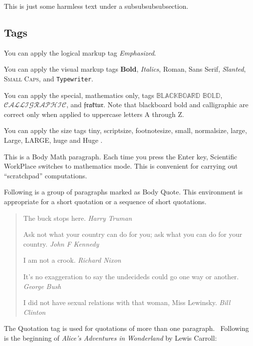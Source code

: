 \documentclass{article}
\begin{document}
This is just some harmless text under a subsubsubsubsection.

\subsection{Tags}

You can apply the logical markup tag \emph{Emphasized}.

You can apply the visual markup tags \textbf{Bold}, \textit{Italics}, 
\textrm{Roman}, \textsf{Sans Serif}, \textsl{Slanted}, \textsc{Small Caps},
and \texttt{Typewriter}.

You can apply the special, mathematics only, tags $\mathbb{BLACKBOARD}$ $%
\mathbb{BOLD}$, $\mathcal{CALLIGRAPHIC}$, and $\mathfrak{fraktur}$. Note
that blackboard bold and calligraphic are correct only when applied to
uppercase letters A through Z.

You can apply the size tags {\tiny tiny}, {\scriptsize scriptsize}, 
{\footnotesize footnotesize}, {\small small}, {\normalsize normalsize}, 
{\large large}, {\Large Large}, {\LARGE LARGE}, {\huge huge} and {\Huge Huge}%
.

This is a Body Math paragraph. Each time you press the Enter key, Scientific
WorkPlace switches to mathematics mode. This is convenient for carrying out
``scratchpad'' computations.

Following is a group of paragraphs marked as Body Quote. This environment is
appropriate for a short quotation or a sequence of short quotations.

\begin{quote}
The buck stops here. \emph{Harry Truman}

Ask not what your country can do for you; ask what you can do for your
country. \emph{John F Kennedy}

I am not a crook. \emph{Richard Nixon}

It's no exaggeration to say the undecideds could go one way or another. 
\emph{George Bush}

I did not have sexual relations with that woman, Miss Lewinsky. \emph{Bill
Clinton}
\end{quote}

The Quotation tag is used for quotations of more than one paragraph. \
Following is the beginning of \emph{Alice's Adventures in Wonderland }by
Lewis Carroll:
\end{document}
